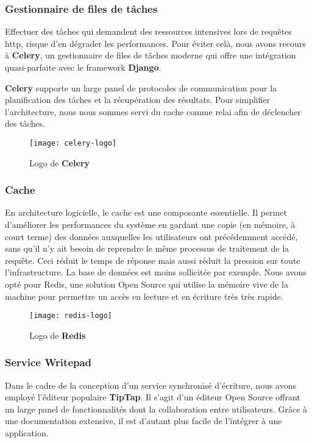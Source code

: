 \subsubsection{Gestionnaire de files de tâches}
Effectuer des tâches qui demandent des ressources intensives lors de requêtes \acrshort{http}, risque d’en dégrader les performances. 
Pour éviter celà, nous avons recours à \textbf{Celery}, un gestionnaire de files de tâches moderne qui offre une intégration quasi-parfaite avec le framework \textbf{Django}.

\textbf{Celery} supporte un large panel de protocoles de communication pour la planification des tâches et la récupération des résultats. 
Pour simplifier l’architecture, nous nous sommes servi du cache comme relai afin de déclencher des tâches.


\begin{figure}[h]
  \centering
  \texttt{[image: celery-logo]}
  \caption{Logo de \textbf{Celery}}
  \label{fig:celery_logo}
\end{figure}


\subsubsection{Cache}
En architecture logicielle, le cache est une composante essentielle. 
Il permet d'améliorer les performances du système en gardant une copie 
(en mémoire, à court terme) des données auxquelles les utilisateurs ont précédemment accédé,
sans qu’il n’y ait besoin de reprendre le même processus de traitement de la requête. 
Ceci réduit le temps de réponse mais aussi réduit la pression sur toute l’infrastructure. 
La base de données est moins sollicitée par exemple. Nous avons opté pour Redis, 
une solution Open Source qui utilise la mémoire vive de la machine pour permettre un accès en lecture 
et en écriture très très rapide.


\begin{figure}[h]
  \centering
  \texttt{[image: redis-logo]}
  \caption{Logo de \textbf{Redis}}
  \label{fig:redis_logo}
\end{figure}

\subsubsection{Service Writepad}
Dans le cadre de la conception d’un service synchronisé d'écriture, nous avons employé l'éditeur populaire \textbf{TipTap}. 
Il s’agit d’un éditeur Open Source offrant un large panel de fonctionnalités dont la collaboration entre utilisateurs. 
Grâce à une documentation extensive, il est d’autant plus facile de l'intégrer à une application.


